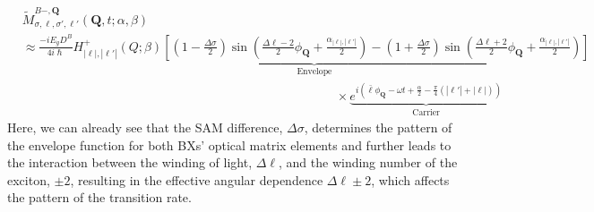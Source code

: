 \begin{equation}
\begin{aligned}
&\tilde{M}_{\sigma,\ell,\sigma',\ell'}^{B-,\boldsymbol{Q}}(\boldsymbol{Q}, t; \alpha, \beta) \\
& \approx \underbrace{\frac{-i E_g D^B}{4i\hslash} H_{|\ell|,|\ell'|}^{+}(Q; \beta) \left[ \left(1 - \tfrac{\Delta\sigma}{2}\right) \sin\left( \tfrac{\Delta\ell - 2}{2}\phi_{\boldsymbol{Q}} + \tfrac{\alpha_{|\ell|,|\ell'|}}{2} \right) - \left(1 + \tfrac{\Delta\sigma}{2}\right) \sin\left( \tfrac{\Delta\ell + 2}{2}\phi_{\boldsymbol{Q}} + \tfrac{\alpha_{|\ell|,|\ell'|}}{2} \right) \right]}_{\text{Envelope}} \\
&\hspace{25em} \times \underbrace{e^{i\left( \bar{\ell}\phi_{\boldsymbol{Q}} - \omega t + \tfrac{\alpha}{2} - \tfrac{\pi}{4} (|\ell'| + |\ell|) \right)}}_{\text{Carrier}}
\end{aligned}
\label{eq:matrixelement_lower_BX}
\end{equation}
Here, we can already see that the SAM difference, $\Delta \sigma$, determines the pattern of the envelope function for both BXs' optical matrix elements and further leads to the interaction between the winding of light, $\Delta \ell$, and the winding number of the exciton, $\pm2$, resulting in the effective angular dependence $\Delta\ell\pm2$, which affects the pattern of the transition rate.

